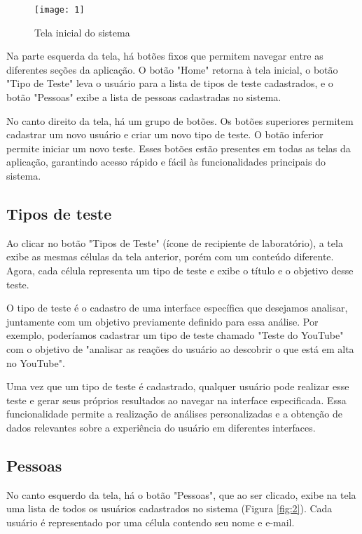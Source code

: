 \begin{figure}[h]
  \caption{Tela inicial do sistema}
  \centering
  \texttt{[image: 1]}
  \label{fig:1}
\end{figure}
\FloatBarrier

Na parte esquerda da tela, há botões fixos que permitem navegar entre as diferentes seções da aplicação. O botão "Home" retorna à tela inicial, o botão "Tipo de Teste" leva o usuário para a lista de tipos de teste cadastrados, e o botão "Pessoas" exibe a lista de pessoas cadastradas no sistema.

No canto direito da tela, há um grupo de botões. Os botões superiores permitem cadastrar um novo usuário e criar um novo tipo de teste. O botão inferior permite iniciar um novo teste. Esses botões estão presentes em todas as telas da aplicação, garantindo acesso rápido e fácil às funcionalidades principais do sistema.

\subsection{Tipos de teste}

Ao clicar no botão "Tipos de Teste" (ícone de recipiente de laboratório), a tela exibe as mesmas células da tela anterior, porém com um conteúdo diferente. Agora, cada célula representa um tipo de teste e exibe o título e o objetivo desse teste.

O tipo de teste é o cadastro de uma interface específica que desejamos analisar, juntamente com um objetivo previamente definido para essa análise. Por exemplo, poderíamos cadastrar um tipo de teste chamado "Teste do YouTube" com o objetivo de "analisar as reações do usuário ao descobrir o que está em alta no YouTube".

Uma vez que um tipo de teste é cadastrado, qualquer usuário pode realizar esse teste e gerar seus próprios resultados ao navegar na interface especificada. Essa funcionalidade permite a realização de análises personalizadas e a obtenção de dados relevantes sobre a experiência do usuário em diferentes interfaces.

\subsection{Pessoas}

No canto esquerdo da tela, há o botão "Pessoas", que ao ser clicado, exibe na tela uma lista de todos os usuários cadastrados no sistema (Figura \ref{fig:2}). Cada usuário é representado por uma célula contendo seu nome e e-mail.

